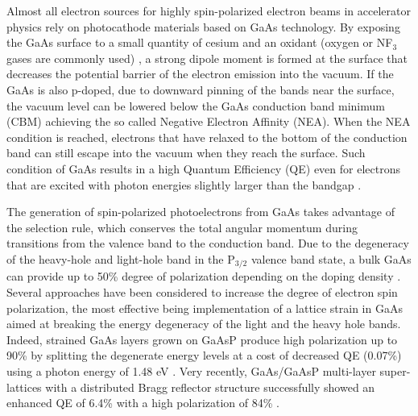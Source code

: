 Almost all electron sources for highly spin-polarized electron beams in accelerator physics rely on photocathode materials based on GaAs technology. By exposing the GaAs surface to a small quantity of cesium and an oxidant (oxygen or NF$_3$ gases are commonly used) \cite{ciccacci1991_ComparativeStudyPreparation}, a strong dipole moment is formed at the surface that decreases the potential barrier of the electron emission into the vacuum. If the GaAs is also p-doped, due to downward pinning of the bands near the surface, the vacuum level can be lowered below the GaAs conduction band minimum (CBM) achieving the so called Negative Electron Affinity (NEA). When the NEA condition is reached, electrons that have relaxed to the bottom of the conduction band can still escape into the vacuum when they reach the surface. Such condition of GaAs results in a high Quantum Efficiency (QE) even for electrons that are excited with photon energies slightly larger than the bandgap \cite{pierce1980_GaAsSpinPolarized}.

The generation of spin-polarized photoelectrons from GaAs takes advantage of the selection rule, which conserves the total angular momentum during transitions from the valence band to the conduction band. Due to the degeneracy of the heavy-hole and light-hole band in the P$_{3/2}$ valence band state, a bulk GaAs can provide up to 50\% degree of polarization depending on the doping density \cite{liu2017_ComprehensiveEvaluationFactors}.
Several approaches have been considered to increase the degree of electron spin polarization, the most effective being implementation of a lattice strain in GaAs aimed at breaking the energy degeneracy of the light and the heavy hole bands. Indeed, strained GaAs layers grown on GaAsP produce high polarization up to 90\% by splitting the degenerate energy levels at a cost of decreased QE (0.07\%) using a photon energy of 1.48 eV \cite{maruyama1992_ElectronspinPolarizationPhotoemission}.
Very recently, GaAs/GaAsP multi-layer super-lattices with a distributed Bragg reflector structure successfully showed an enhanced QE of 6.4\% with a high polarization of 84\% \cite{liu2016_RecordlevelQuantumEfficiency}.

